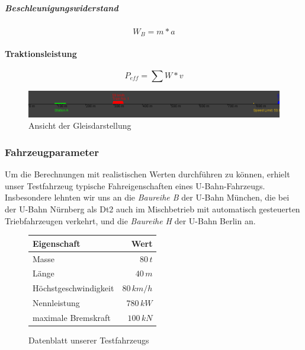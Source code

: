 \documentclass[10pt,a4paper]{article}
\begin{document}
\subparagraph{Beschleunigungswiderstand}
\begin{equation}
W_B = m * a
\end{equation}

\paragraph{Traktionsleistung}
\begin{equation}
P_{eff} = \sum W * v
\end{equation}

\begin{figure}[htb]
\includegraphics[width=\textwidth]{track}
\caption[Screenshot]{Ansicht der Gleisdarstellung}
\label{track}
\end{figure}

\subsubsection{Fahrzeugparameter}
Um die Berechnungen mit realistischen Werten durchführen zu können, erhielt unser Testfahrzeug typische Fahreigenschaften eines U-Bahn-Fahrzeugs. Insbesondere lehnten wir uns an die \textit{Baureihe B} der U-Bahn München, die bei der U-Bahn Nürnberg als Dt2 auch im Mischbetrieb mit automatisch gesteuerten Triebfahrzeugen verkehrt, und die \textit{Baureihe H} der U-Bahn Berlin an.

\begin{figure}[h]
\begin{center}
\begin{tabular}{|lr|}
\hline \textbf{Eigenschaft} & \textbf{Wert} \\ 
\hline Masse & $ 80\, t$ \\ 
\hline Länge & $ 40\, m$ \\ 
\hline Höchstgeschwindigkeit & $ 80 \, km/h $ \\ 
\hline Nennleistung & $ 780 \, kW $ \\ 
\hline maximale Bremskraft & $ 100 \, kN $ \\ 
\hline 
\end{tabular} 
\end{center}
\caption{Datenblatt unserer Testfahrzeugs}
\label{datenblatt}
\end{figure}
\end{document}
